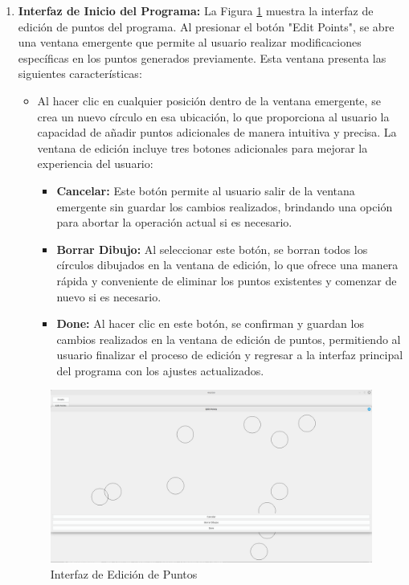 \documentclass[conference]{IEEEtran}
\begin{document}
\begin{enumerate}
\item \textbf{Interfaz de Inicio del Programa:}
La Figura \ref{fig:interfaz_edicion_puntos} muestra la interfaz de edición de puntos del programa. Al presionar el botón "Edit Points", se abre una ventana emergente que permite al usuario realizar modificaciones específicas en los puntos generados previamente. Esta ventana presenta las siguientes características:

\begin{itemize}
    \item Al hacer clic en cualquier posición dentro de la ventana emergente, se crea un nuevo círculo en esa ubicación, lo que proporciona al usuario la capacidad de añadir puntos adicionales de manera intuitiva y precisa. La ventana de edición incluye tres botones adicionales para mejorar la experiencia del usuario:
    \begin{itemize}
        \item \textbf{Cancelar:} Este botón permite al usuario salir de la ventana emergente sin guardar los cambios realizados, brindando una opción para abortar la operación actual si es necesario.
        \item \textbf{Borrar Dibujo:} Al seleccionar este botón, se borran todos los círculos dibujados en la ventana de edición, lo que ofrece una manera rápida y conveniente de eliminar los puntos existentes y comenzar de nuevo si es necesario.
        \item \textbf{Done:} Al hacer clic en este botón, se confirman y guardan los cambios realizados en la ventana de edición de puntos, permitiendo al usuario finalizar el proceso de edición y regresar a la interfaz principal del programa con los ajustes actualizados.
    \end{itemize}
\end{itemize}

\begin{figure}[h]
    \centering
    \includegraphics[width=0.8\linewidth]{images/3.png}
    \caption{Interfaz de Edición de Puntos}
    \label{fig:interfaz_edicion_puntos}
    \end{figure}



\end{enumerate}
\end{document}
